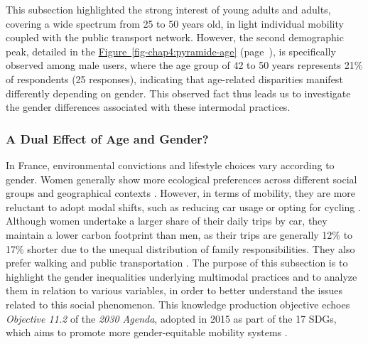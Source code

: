 \begin{refsegment}
This subsection highlighted the strong interest of young adults and adults, covering a wide spectrum from 25 to 50 years old, in light individual mobility coupled with the public transport network. However, the second demographic peak, detailed in the \hyperref[fig-chap4:pyramide-age]{Figure~\ref{fig-chap4:pyramide-age}} (page~\pageref{fig-chap4:pyramide-age}), is specifically observed among male users, where the age group of 42 to 50 years represents 21\% of respondents (25 responses), indicating that age-related disparities manifest differently depending on gender. This observed fact thus leads us to investigate the gender differences associated with these intermodal practices.%

\subsubsection*{A Dual Effect of Age and Gender?
    \label{chap4:demographie-genre}
    }

In France, environmental convictions and lifestyle choices vary according to gender. Women generally show more ecological preferences across different social groups and geographical contexts \textcolor{blue}{\autocite[29]{pech_femmes_2021}}. However, in terms of mobility, they are more reluctant to adopt modal shifts, such as reducing car usage or opting for cycling \textcolor{blue}{\autocite[25]{pech_femmes_2021}}. Although women undertake a larger share of their daily trips by car, they maintain a lower carbon footprint than men, as their trips are generally 12\% to 17\% shorter due to the unequal distribution of family responsibilities. They also prefer walking and public transportation \textcolor{blue}{\autocite[6]{shaw_beyond_2020}}. The purpose of this subsection is to highlight the gender inequalities underlying multimodal practices and to analyze them in relation to various variables, in order to better understand the issues related to this social phenomenon. This knowledge production objective echoes \textsl{Objective 11.2} of the \textsl{2030 Agenda}, adopted in 2015 as part of the 17 \acrfull{SDGs}, which aims to promote more gender-equitable mobility systems \textcolor{blue}{\autocite{united_nations_transforming_2015}}. %


\end{refsegment}
